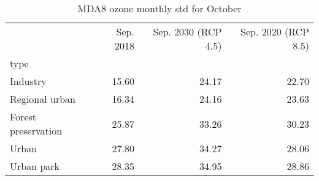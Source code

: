 \begin{table}
\centering
\caption{MDA8 ozone monthly std for October}
\label{o3_oct_type}
\begin{tabular}{lrrr}
\toprule
{} &  Sep. 2018 &  Sep. 2030 (RCP 4.5) &  Sep. 2020 (RCP 8.5) \\
type                &            &                      &                      \\
\midrule
Industry            &      15.60 &                24.17 &                22.70 \\
Regional urban      &      16.34 &                24.16 &                23.63 \\
Forest preservation &      25.87 &                33.26 &                30.23 \\
Urban               &      27.80 &                34.27 &                28.06 \\
Urban park          &      28.35 &                34.95 &                28.86 \\
\bottomrule
\end{tabular}
\end{table}

